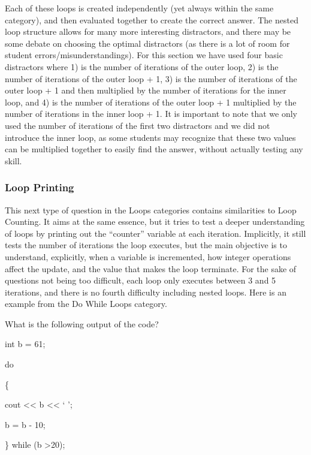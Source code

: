 \documentclass{article}
\begin{document}
Each of these loops is created independently (yet always within the same category), and then evaluated together to create the correct answer. The nested loop structure allows for many more
interesting distractors, and there may be some debate on choosing the optimal distractors (as there is a lot of room for student errors/misunderstandings). For this section we have used four
basic distractors where 1)  is the number of iterations of the outer loop, 2) is the number of iterations of the outer loop + 1, 3) is the number of iterations of the outer loop + 1 and then 
multiplied by the number of iterations for the inner loop, and 4) is the number of iterations of the outer loop + 1 multiplied by the number of iterations in the inner loop + 1. It is important to 
note that we only used the number of iterations of the first two distractors and we did not introduce the inner loop, as some students may recognize that these two values can be multiplied 
together to easily find the answer, without actually testing any skill.

\subsubsection{Loop Printing}

This next type of question in the Loops categories contains similarities to Loop Counting. It aims at the same essence, but it tries to test a deeper understanding of loops by printing out the 
``counter'' variable at each iteration. Implicitly, it still tests the number of iterations the loop executes, but the main objective is to understand, explicitly, when a variable is incremented,
how integer operations affect the update, and the value that makes the loop terminate. For the sake of questions not being too difficult, each loop only executes between 3 and 5 iterations, and there is no fourth difficulty including nested loops. Here is an example from the Do While Loops category.

\hfill \par
What is the following output of the code? \par
int b = 61; \par
do \par
\{ \par
\indent\indent cout \textless\textless{} b \textless\textless{} ` '; \par
\indent\indent b = b - 10; \par
\} while (b \textgreater 20); \par
\hfill \par
\end{document}
